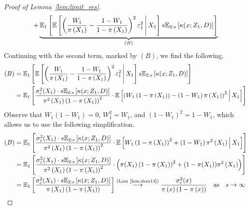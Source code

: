 \begin{proof}[Proof of Lemma~\ref{lem:limit_res}]
\begin{equation}
\begin{aligned}
			+ \underbrace{\mathbb{E}_{1}\left[\mathbb{E}\left[\left(\frac{W_{1}}{\pi\left(X_1\right)} - \frac{1 - W_{1}}{1 - \pi\left(X_1\right)}\right)^2 \varepsilon_{1}^2 \, \middle| \, X_1\right] s \mathbb{E}_{2:s}\left[\kappa(x; Z_1, D)\right]\right]}_{(B)}
		\end{aligned}
	\end{equation}
	Continuing with the second term, marked by $(B)$, we find the following.
	\begin{equation}
		\begin{aligned}
			(B) 
			& = \mathbb{E}_{1}\left[\mathbb{E}\left[\left(\frac{W_{1}}{\pi\left(X_1\right)} - \frac{1 - W_{1}}{1 - \pi\left(X_1\right)}\right)^2 \varepsilon_{1}^2 \, \middle| \, X_1\right] s \mathbb{E}_{2:s}\left[\kappa(x; Z_1, D)\right]\right]\\
			& = \mathbb{E}_{1}\left[\frac{\sigma_{\varepsilon}^2(X_1) \cdot s \mathbb{E}_{2:s}\left[\kappa(x; Z_1, D)\right]}{\pi^2\left(X_1\right)\left(1 - \pi\left(X_1\right)\right)^2} \cdot 
			\mathbb{E}\left[\left(W_{1}\left(1 - \pi\left(X_1\right)\right) - \left(1 - W_{1}\right)\pi\left(X_1\right)\right)^2 \, \middle| \, X_1\right] \right]\\
		\end{aligned}
	\end{equation}
	Observe that $W_1(1-W_1) = 0$, $W_1^2 = W_1$, and $(1-W_1)^2 = 1 - W_1$, which allows us to use the following simplification.
	\begin{equation}
		\begin{aligned}
			(B) 
			& = \E_{1}\left[\frac{\sigma_{\varepsilon}^2(X_1) \cdot s \E_{2:s}\left[\kappa(x; Z_1, D)\right]}{\pi^2\left(X_1\right)\left(1 - \pi\left(X_1\right)\right)^2} \cdot 
			\E\left[W_{1}\left(1 - \pi\left(X_1\right)\right)^2 + \left(1 - W_{1}\right)\pi^2\left(X_1\right) \, \middle| \, X_1\right] \right]\\
			& = \E_{1}\left[\frac{\sigma_{\varepsilon}^2(X_1) \cdot s \E_{2:s}\left[\kappa(x; Z_1, D)\right]}{\pi^2\left(X_1\right)\left(1 - \pi\left(X_1\right)\right)^2} \cdot 
			\left(\pi(X_1)\left(1 - \pi\left(X_1\right)\right)^2 + (1 - \pi(X_1))\pi^2\left(X_1\right) \right)\right]\\
			& = \E_{1}\left[\frac{\sigma_{\varepsilon}^2(X_1) \cdot s \E_{2:s}\left[\kappa(x; Z_1, D)\right]}{\pi\left(X_1\right)\left(1 - \pi\left(X_1\right)\right)}\right]
			\overset{\text{(Lem~\ref{lem:dem13})}}{\longrightarrow} \frac{\sigma_{\varepsilon}^2(x)}{\pi\left(x\right)\left(1 - \pi\left(x\right)\right)}
			\quad \text{as} \quad s \rightarrow \infty
		\end{aligned}

\end{equation}
\end{proof}
